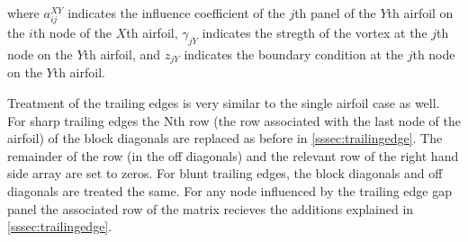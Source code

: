 \noindent where \(a_{ij}^{XY}\) indicates the influence coefficient of the \(j\)th panel of the \(Y\)th airfoil on the \(i\)th node of the \(X\)th airfoil, \(\gamma_{jY}\) indicates the stregth of the vortex at the \(j\)th node on the \(Y\)th airfoil, and \(z_{jY}\) indicates the boundary condition at the \(j\)th node on the \(Y\)th airfoil.

Treatment of the trailing edges is very similar to the single airfoil case as well.  For sharp trailing edges the Nth row (the row associated with the last node of the airfoil) of the block diagonals are replaced as before in \cref{sssec:trailingedge}. The remainder of the row (in the off diagonals) and the relevant row of the right hand side array are set to zeros.  For blunt trailing edges, the block diagonals and off diagonals are treated the same. For any node influenced by the trailing edge gap panel the associated row of the matrix recieves the additions explained in \cref{sssec:trailingedge}.
